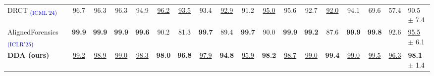 \documentclass{article}
\begin{document}
\begin{table}[tb!]
\begin{adjustbox}{width=1.0\linewidth}
\begin{tabular}{lccccccccccccccccl}
DRCT \textsubscript{\textcolor{blue}{(ICML'24)}} \cite{chen2024drct} & 96.7 & 96.3 & 96.3 & 94.9 & \underline{96.2} & \underline{93.5} & 93.4 & \underline{92.9} & 91.2 & \underline{95.0} & 95.6 & 92.7 & \underline{92.0} & 94.1 & 69.6 & 57.4 & 90.5 $\pm$ 7.4 \\
AlignedForensics \textsubscript{\textcolor{blue}{(ICLR'25)}} \cite{rajan2025aligned} & \textbf{99.9} & \textbf{99.9} & \textbf{99.9} & \textbf{99.6} & 90.2 & 81.3 & \textbf{99.7} & 89.4 & \textbf{99.7} & 90.0 & \textbf{99.9} & \textbf{99.2} & 87.6 & \textbf{99.9} & \textbf{99.8} & 92.6 & \underline{95.5} $\pm$ 6.1 \\
  \midrule
  \rowcolor{myblue}
\textbf{DDA (ours)} & \underline{99.2} & \underline{98.9} & \underline{99.0} & \underline{98.3} & \textbf{98.0} & \textbf{96.8} & \underline{97.9} & \textbf{94.8} & \underline{95.9} & \textbf{98.2} & \underline{98.7} & \underline{99.0} & \textbf{99.4} & \underline{99.0} & \underline{99.5} & \underline{96.3} & \textbf{98.1} $\pm$ 1.4 \\
\bottomrule
  \end{tabular}
  \end{adjustbox}
  \vspace{0pt}
\end{table}
\end{document}
